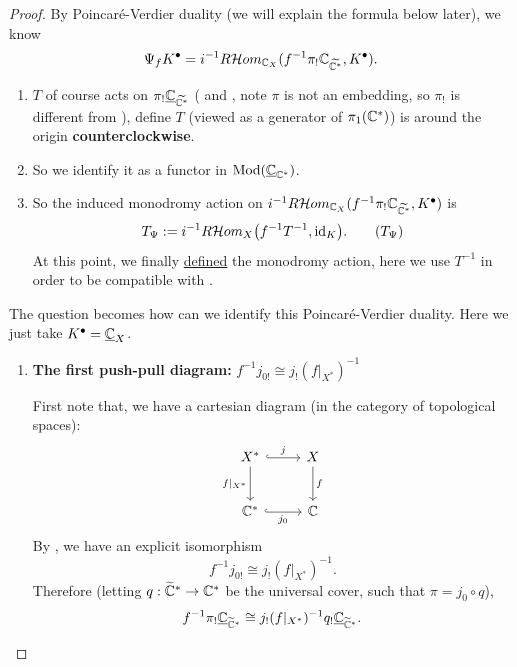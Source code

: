 \begin{proof}
    By Poincar\'e-Verdier duality (we will explain the formula below later), we know
    \[
        \Psi_f{K^\bullet}=i^{-1}R\mathcal{H}om_{{\mathbb{C}_{X}}}(f^{-1}{\pi}_!\mathbb{C}_{\widetilde{\mathbb{C}^*}}, {K^\bullet}).
    \]
    \begin{enumerate}
        \item $T$ of course acts on $\pi_!\underline{\mathbb{C}}_{\widetilde{\mathbb{C}^*}}$
              (\cite[Definition~C.1.1]{hotta2008d} and \cite[Eq.~2.5.1]{KashiwaraSchapira1994Sheaves}, note $\pi$ is not an embedding, so $\pi_!$ is different from \cite[23.4.7]{VakilRisingSea2025}),
              \cite{Wu2017NearbyVanishingCycles} define $T$ (viewed as a generator of $\pi_1(\mathbb{C}^*)$) is around the origin \textbf{counterclockwise}.
        \item So we identify it as a functor in $\mathrm{Mod}(\underline{\mathbb{C}}_{\mathbb{C}^*})$.
        \item So the induced monodromy action on $i^{-1}R\mathcal{H}om_{{\mathbb{C}_{X}}}(f^{-1}{\pi}_!\mathbb{C}_{\widetilde{\mathbb{C}^*}}, {K^\bullet})$ is
              \begin{equation}
                  T_{\Psi} := i^{-1}R\mathcal Hom_X\bigl(f^{-1}T^{-1},\mathrm{id}_K\bigr). \tag{$T_{\Psi}$}\label{eq:T_Psi}
              \end{equation}
              At this point, we finally \underline{defined} the monodromy action, here we use $T^{-1}$ in order to be compatible with \cite[Lem.~3.8]{Wu2017NearbyVanishingCycles}.
    \end{enumerate}
    The question becomes how can we identify this Poincar\'e-Verdier duality. Here we just take $K^\bullet = \underline{\mathbb{C}}_X$.
    \begin{enumerate}
        \item \textbf{The first push-pull diagram:} $f^{-1} j_{0!} \cong j_! (f|_{X^*})^{-1}$

              First note that, we have a cartesian diagram (in the category of topological spaces):
              \[
                  \begin{tikzcd}[row sep=2.5em, column sep=2.5em]
                      X^* \arrow[r, hook, "j"] \arrow[d, "f|_{X^*}"'] & X \arrow[d, "f"] \\
                      \C^* \arrow[r, hook, "j_0"']                    & \C
                  \end{tikzcd}
              \]
              By \cite[Proposition~C.1.2]{hotta2008d}, we have an explicit isomorphism
              \[
                  f^{-1} j_{0!} \cong j_! (f|_{X^*})^{-1}.
              \]
              Therefore (letting $q: \widetilde{\mathbb{C}}^* \to \mathbb{C}^*$ be the universal cover, such that $\pi = j_0 \circ q$),
              \[
                  f^{-1} \pi_! \underline{\mathbb{C}}_{\widetilde{\mathbb{C}}^*} \cong j_! (f|_{X^*})^{-1} q_! \underline{\mathbb{C}}_{\widetilde{\mathbb{C}}^*}.
              \]


\end{enumerate}
\end{proof}
